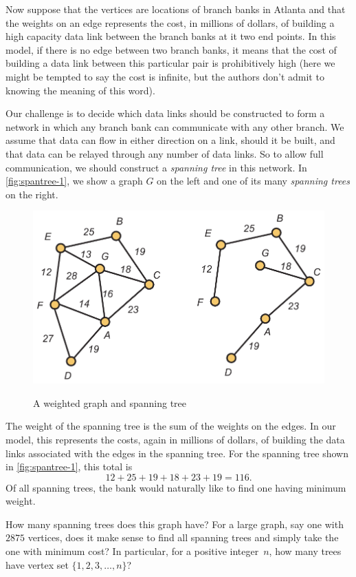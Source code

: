 \begin{example}
  Now suppose that the vertices are locations of branch banks in
  Atlanta and that the weights on an edge represents the cost, in
  millions of dollars, of building a high capacity data link between
  the branch banks at it two end points.  In this model, if there is
  no edge between two branch banks, it means that the cost of building
  a data link between this particular pair is prohibitively high (here
  we might be tempted to say the cost is infinite, but the authors don't
  admit to knowing the meaning of this word).

  Our challenge is to decide which data links should be constructed to
  form a network in which any branch bank can communicate with any
  other branch.  We assume that data can flow in either direction on a
  link, should it be built, and that data can be relayed through any
  number of data links.  So to allow full communication, we should
  construct a \textit{spanning tree} in this network.  In
  \autoref{fig:spantree-1}, we show a graph $G$ on the left and one of
  its many \textit{spanning trees} on the right.

\begin{figure}
\begin{center}
\includegraphics[scale=.6]{intro-figs/3012-fig19}\\
\end{center}
\caption{A weighted graph and spanning tree}
\label{fig:spantree-1}
\end{figure}

The weight of the spanning tree is the sum of the weights on the
edges.  In our model, this represents the costs, again in millions of
dollars, of building the data links associated with the edges in the
spanning tree.  For the spanning tree shown in
\autoref{fig:spantree-1}, this total is
\[
12+25+19+18+23+19 = 116.
\]
Of all spanning trees, the bank would naturally like to find one
having minimum weight.

How many spanning trees does this graph have?  For a large graph, say
one with $2875$ vertices, does it make sense to find all spanning
trees and simply take the one with minimum cost?  In particular, for a
positive integer~$n$, how many trees have vertex set
$\{1,2,3,\dots,n\}$?
\end{example}

